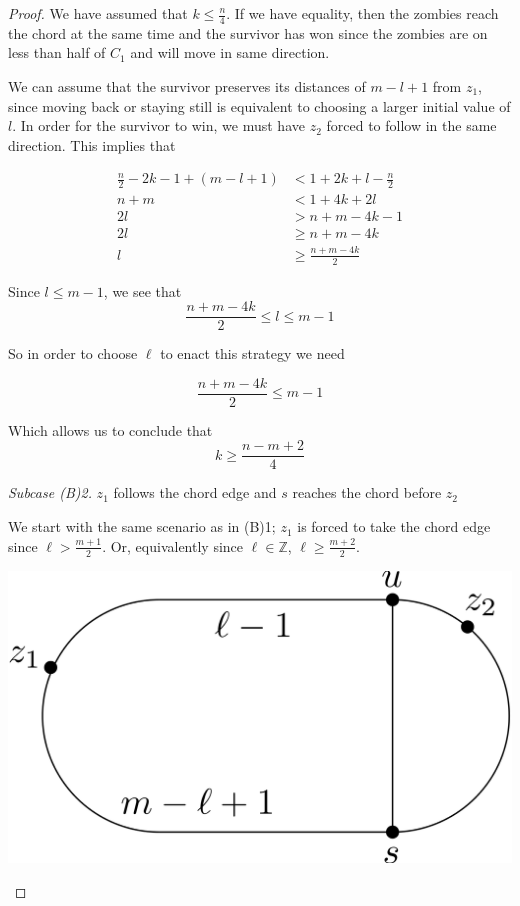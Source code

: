 \documentclass[letterpaper, 10pt]{article}
\newcommand{\Z}{\mathbb{Z}}
\begin{document}
\begin{proof}
We have assumed that $k \leq \frac{n}{4}$. If we have equality, then the zombies reach
the chord at the same time and the survivor has won since the zombies are on less than half
of $C_1$ and will move in same direction.

We can assume that the survivor preserves its distances of $m-l+1$ from $z_1$,
since moving back or staying still is equivalent to choosing a larger initial value of $l$.
In order for the survivor to win, we must have $z_2$ forced to follow in the same direction.
This implies that

\begin{align*}
\frac{n}{2} -2k -1 + (m-l+1) & < 1 + 2k + l - \frac{n}{2} \\
n+m                          & < 1 + 4k + 2l              \\
2l                           & > n+m - 4k -1              \\
2l                           & \geq n+m -4k               \\
l                            & \geq \frac{n+m-4k}{2}
\end{align*}

Since $l \leq m -1$, we see that
\[ \frac{n+m-4k}{2} \leq l \leq m-1 \]

So in order to choose $\ell$ to enact this strategy we need

\[ \frac{n+m-4k}{2} \leq m-1 \]

Which allows us to conclude that
\[ k \geq \frac{n-m+2}{4} \]

\emph{Subcase (B)2.} $z_1$ follows the chord edge and $s$ reaches the chord before $z_2$

We start with the same scenario as in (B)1; $z_1$ is forced to take the chord edge since
$\ell > \frac{m+1}{2}$. Or, equivalently since $\ell \in \Z$, $\ell \geq \frac{m+2}{2}$.

\begin{center}
\includegraphics[scale=0.15]{diagramCaseB2_2}
\end{center}


\end{proof}
\end{document}
